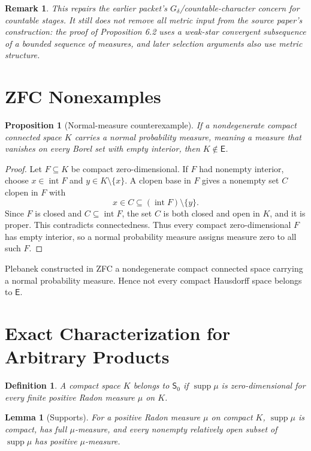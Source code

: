 \documentclass[11pt]{article}
\newtheorem{lemma}{Lemma}
\newtheorem{proposition}{Proposition}
\newtheorem{definition}{Definition}
\newtheorem{remark}{Remark}
\newcommand{\E}{\mathsf E}
\newcommand{\Szero}{\mathsf S_0}
\newcommand{\supp}{\operatorname{supp}}
\begin{document}
\begin{remark}
This repairs the earlier packet's \(G_\delta\)/countable-character concern for
countable stages.  It still does not remove all metric input from the source
paper's construction: the proof of Proposition 6.2 uses a weak-star convergent
subsequence of a bounded sequence of measures, and later selection arguments
also use metric structure.
\end{remark}

\section{ZFC Nonexamples}

\begin{proposition}[Normal-measure counterexample]
If a nondegenerate compact connected space \(K\) carries a normal probability
measure, meaning a measure that vanishes on every Borel set with empty interior,
then \(K\notin\E\).
\end{proposition}

\begin{proof}
Let \(F\subseteq K\) be compact zero-dimensional.  If \(F\) had nonempty
interior, choose \(x\in\operatorname{int}F\) and \(y\in K\setminus\{x\}\).  A
clopen base in \(F\) gives a nonempty set \(C\) clopen in \(F\) with
\[
 x\in C\subseteq(\operatorname{int}F)\setminus\{y\}.
\]
Since \(F\) is closed and \(C\subseteq\operatorname{int}F\), the set \(C\) is
both closed and open in \(K\), and it is proper.  This contradicts connectedness.
Thus every compact zero-dimensional \(F\) has empty interior, so a normal
probability measure assigns measure zero to all such \(F\).
\end{proof}

Plebanek constructed in ZFC a nondegenerate compact connected space carrying a
normal probability measure.  Hence not every compact Hausdorff space belongs to
\(\E\).

\section{Exact Characterization for Arbitrary Products}

\begin{definition}
A compact space \(K\) belongs to \(\Szero\) if \(\supp\mu\) is zero-dimensional
for every finite positive Radon measure \(\mu\) on \(K\).
\end{definition}

\begin{lemma}[Supports]
For a positive Radon measure \(\mu\) on compact \(K\), \(\supp\mu\) is compact,
has full \(\mu\)-measure, and every nonempty relatively open subset of
\(\supp\mu\) has positive \(\mu\)-measure.
\end{lemma}
\end{document}
